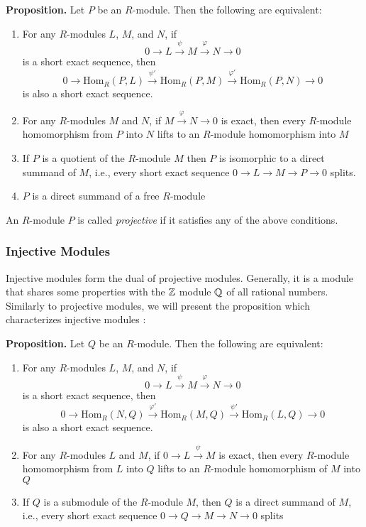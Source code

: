 \documentclass[11pt, reqno]{amsart}
\theoremstyle{plain}
\theoremstyle{definition}
\theoremstyle{example}
\def\Hom{\mathrm{Hom}}
\begin{document}
\par
\textbf{Proposition.} Let $P$ be an $R$-module. Then the following are equivalent:
\begin{enumerate}
\item For any $R$-modules $L$, $M$, and $N$, if $$0 \rightarrow L \xrightarrow{\psi} M \xrightarrow{\varphi} N \rightarrow 0$$ is a short exact sequence, then $$0 \rightarrow \Hom_R(P, L) \xrightarrow{\psi'} \Hom_R(P, M) \xrightarrow{\varphi'} \Hom_R(P, N) \rightarrow 0$$ is also a short exact sequence.

\item For any $R$-modules $M$ and $N$, if $M \xrightarrow{\varphi} N \rightarrow 0$ is exact, then every $R$-module homomorphism from $P$ into $N$ lifts to an $R$-module homomorphism into $M$

\item If $P$ is a quotient of the $R$-module $M$ then $P$ is isomorphic to a direct summand of $M$, i.e., every short exact sequence $0 \rightarrow L \rightarrow M \rightarrow P \rightarrow 0$ splits.

\item $P$ is a direct summand of a free $R$-module
\end{enumerate}

An $R$-module $P$ is called \textit{projective} if it satisfies any of the above conditions.

\subsubsection{Injective Modules}

Injective modules form the dual of projective modules. Generally, it is a module that shares some properties with the $\mathbb{Z}$ module $\mathbb{Q}$ of all rational numbers. Similarly to projective modules, we will present the proposition which characterizes injective modules \cite[\S 10.5, p. 394]{dummit}:

\par
\textbf{Proposition.} Let $Q$ be an $R$-module. Then the following are equivalent:
\begin{enumerate}
\item For any $R$-modules $L$, $M$, and $N$, if $$0 \rightarrow L \xrightarrow{\psi} M \xrightarrow{\varphi} N \rightarrow 0$$ is a short exact sequence, then $$0 \rightarrow \Hom_R(N, Q) \xrightarrow{\varphi'} \Hom_R(M, Q) \xrightarrow{\psi'} \Hom_R(L, Q) \rightarrow 0$$ is also a short exact sequence.

\item For any $R$-modules $L$ and $M$, if $0 \rightarrow L \xrightarrow{\psi} M$ is exact, then every $R$-module homomorphism from $L$ into $Q$ lifts to an $R$-module homomorphism of $M$ into $Q$

\item If $Q$ is a submodule of the $R$-module $M$, then $Q$ is a direct summand of $M$, i.e., every short exact sequence $0 \rightarrow Q \rightarrow M \rightarrow N \rightarrow 0$ splits
\end{enumerate}
\end{document}
